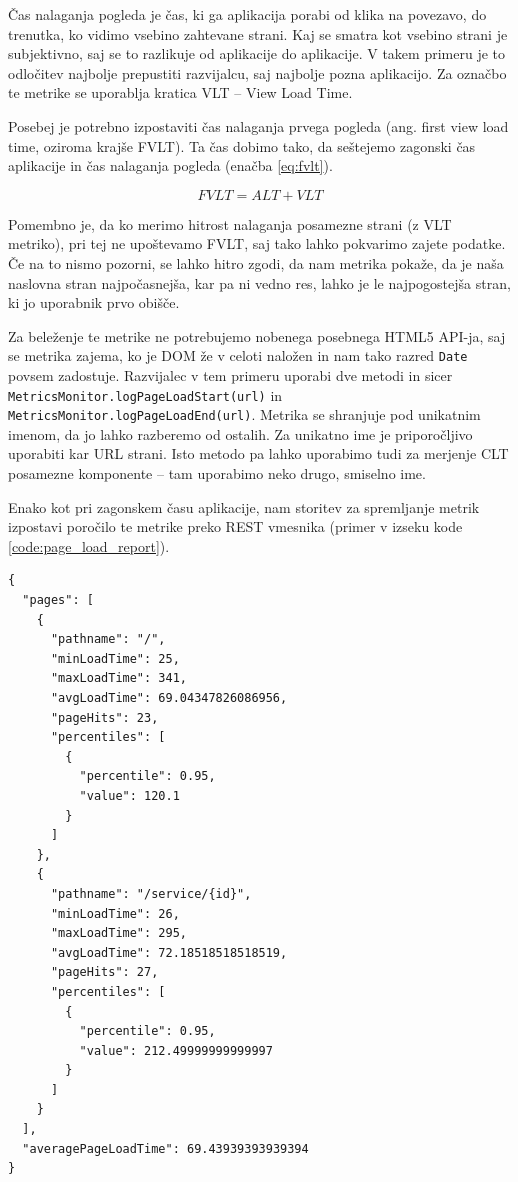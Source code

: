 \documentclass[a4paper, 12pt]{book}
\begin{document}
Čas nalaganja pogleda je čas, ki ga aplikacija porabi od klika na povezavo, do trenutka, ko vidimo vsebino zahtevane strani. Kaj se smatra kot vsebino strani je subjektivno, saj se to razlikuje od aplikacije do aplikacije. V takem primeru je to odločitev najbolje prepustiti razvijalcu, saj najbolje pozna aplikacijo. Za označbo te metrike se uporablja kratica VLT – View Load Time.

Posebej je potrebno izpostaviti čas nalaganja prvega pogleda (ang. first view load time, oziroma krajše FVLT). Ta čas dobimo tako, da seštejemo zagonski čas aplikacije in čas nalaganja pogleda (enačba \ref{eq:fvlt}).

\begin{equation}
\label{eq:fvlt}
FVLT = ALT + VLT
\end{equation}

Pomembno je, da ko merimo hitrost nalaganja posamezne strani (z VLT metriko), pri tej ne upoštevamo FVLT, saj tako lahko pokvarimo zajete podatke. Če na to nismo pozorni, se lahko hitro zgodi, da nam metrika pokaže, da je naša naslovna stran najpočasnejša, kar pa ni vedno res, lahko je le najpogostejša stran, ki jo uporabnik prvo obišče.

Za beleženje te metrike ne potrebujemo nobenega posebnega HTML5 API-ja, saj se metrika zajema, ko je DOM že v celoti naložen in nam tako razred \verb|Date| povsem zadostuje. Razvijalec v tem primeru uporabi dve metodi in sicer \verb|MetricsMonitor.logPageLoadStart(url)| in \\ \verb|MetricsMonitor.logPageLoadEnd(url)|. Metrika se shranjuje pod unikatnim imenom, da jo lahko razberemo od ostalih. Za unikatno ime je priporočljivo uporabiti kar URL strani. Isto metodo pa lahko uporabimo tudi za merjenje CLT posamezne komponente – tam uporabimo neko drugo, smiselno ime.
 
Enako kot pri zagonskem času aplikacije, nam storitev za spremljanje metrik izpostavi poročilo te metrike preko REST vmesnika (primer v izseku kode \ref{code:page_load_report}).

\begin{lstlisting}[label=code:page_load_report, caption=Poročilo časa nalaganja pogleda]
{
  "pages": [
    {
      "pathname": "/",
      "minLoadTime": 25,
      "maxLoadTime": 341,
      "avgLoadTime": 69.04347826086956,
      "pageHits": 23,
      "percentiles": [
        {
          "percentile": 0.95,
          "value": 120.1
        }
      ]
    },
    {
      "pathname": "/service/{id}",
      "minLoadTime": 26,
      "maxLoadTime": 295,
      "avgLoadTime": 72.18518518518519,
      "pageHits": 27,
      "percentiles": [
        {
          "percentile": 0.95,
          "value": 212.49999999999997
        }
      ]
    }
  ],
  "averagePageLoadTime": 69.43939393939394
}
\end{lstlisting}
\end{document}
